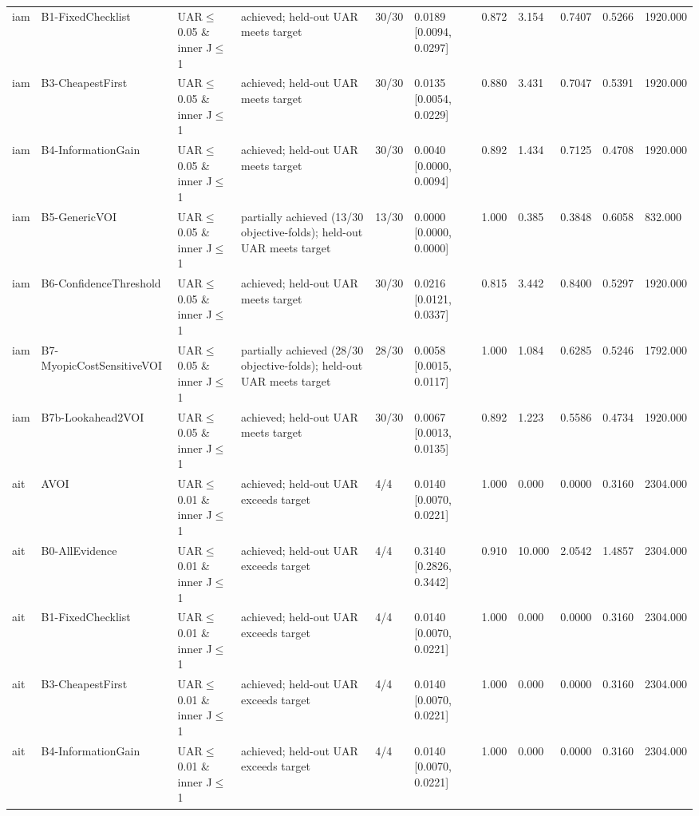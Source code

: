 \begin{table}[!ht]
{\begin{tabular}{lllllllllll}
iam & B1-FixedChecklist & UAR$\le$0.05 \& inner J$\le$1 & achieved; held-out UAR meets target & 30/30 & 0.0189 [0.0094, 0.0297] & 0.872 & 3.154 & 0.7407 & 0.5266 & 1920.000 \\
iam & B3-CheapestFirst & UAR$\le$0.05 \& inner J$\le$1 & achieved; held-out UAR meets target & 30/30 & 0.0135 [0.0054, 0.0229] & 0.880 & 3.431 & 0.7047 & 0.5391 & 1920.000 \\
iam & B4-InformationGain & UAR$\le$0.05 \& inner J$\le$1 & achieved; held-out UAR meets target & 30/30 & 0.0040 [0.0000, 0.0094] & 0.892 & 1.434 & 0.7125 & 0.4708 & 1920.000 \\
iam & B5-GenericVOI & UAR$\le$0.05 \& inner J$\le$1 & partially achieved (13/30 objective-folds); held-out UAR meets target & 13/30 & 0.0000 [0.0000, 0.0000] & 1.000 & 0.385 & 0.3848 & 0.6058 & 832.000 \\
iam & B6-ConfidenceThreshold & UAR$\le$0.05 \& inner J$\le$1 & achieved; held-out UAR meets target & 30/30 & 0.0216 [0.0121, 0.0337] & 0.815 & 3.442 & 0.8400 & 0.5297 & 1920.000 \\
iam & B7-MyopicCostSensitiveVOI & UAR$\le$0.05 \& inner J$\le$1 & partially achieved (28/30 objective-folds); held-out UAR meets target & 28/30 & 0.0058 [0.0015, 0.0117] & 1.000 & 1.084 & 0.6285 & 0.5246 & 1792.000 \\
iam & B7b-Lookahead2VOI & UAR$\le$0.05 \& inner J$\le$1 & achieved; held-out UAR meets target & 30/30 & 0.0067 [0.0013, 0.0135] & 0.892 & 1.223 & 0.5586 & 0.4734 & 1920.000 \\
ait & AVOI & UAR$\le$0.01 \& inner J$\le$1 & achieved; held-out UAR exceeds target & 4/4 & 0.0140 [0.0070, 0.0221] & 1.000 & 0.000 & 0.0000 & 0.3160 & 2304.000 \\
ait & B0-AllEvidence & UAR$\le$0.01 \& inner J$\le$1 & achieved; held-out UAR exceeds target & 4/4 & 0.3140 [0.2826, 0.3442] & 0.910 & 10.000 & 2.0542 & 1.4857 & 2304.000 \\
ait & B1-FixedChecklist & UAR$\le$0.01 \& inner J$\le$1 & achieved; held-out UAR exceeds target & 4/4 & 0.0140 [0.0070, 0.0221] & 1.000 & 0.000 & 0.0000 & 0.3160 & 2304.000 \\
ait & B3-CheapestFirst & UAR$\le$0.01 \& inner J$\le$1 & achieved; held-out UAR exceeds target & 4/4 & 0.0140 [0.0070, 0.0221] & 1.000 & 0.000 & 0.0000 & 0.3160 & 2304.000 \\
ait & B4-InformationGain & UAR$\le$0.01 \& inner J$\le$1 & achieved; held-out UAR exceeds target & 4/4 & 0.0140 [0.0070, 0.0221] & 1.000 & 0.000 & 0.0000 & 0.3160 & 2304.000 \\

\end{tabular}}
\end{table}
